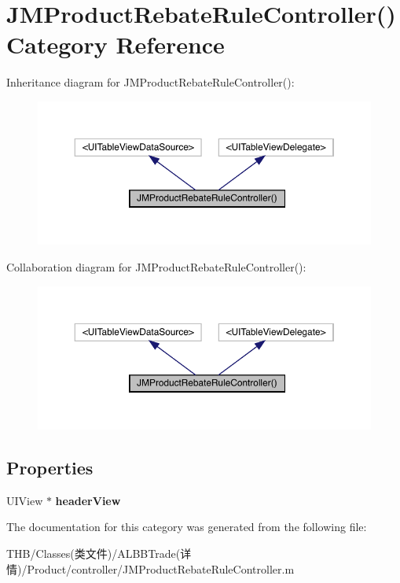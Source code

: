 \hypertarget{category_j_m_product_rebate_rule_controller_07_08}{}\section{J\+M\+Product\+Rebate\+Rule\+Controller() Category Reference}
\label{category_j_m_product_rebate_rule_controller_07_08}


Inheritance diagram for J\+M\+Product\+Rebate\+Rule\+Controller()\+:\nopagebreak
\begin{figure}[H]
\begin{center}
\leavevmode
\includegraphics[width=350pt]{category_j_m_product_rebate_rule_controller_07_08__inherit__graph}
\end{center}
\end{figure}


Collaboration diagram for J\+M\+Product\+Rebate\+Rule\+Controller()\+:\nopagebreak
\begin{figure}[H]
\begin{center}
\leavevmode
\includegraphics[width=350pt]{category_j_m_product_rebate_rule_controller_07_08__coll__graph}
\end{center}
\end{figure}
\subsection*{Properties}
\begin{DoxyCompactItemize}
\item 
\mbox{\label{category_j_m_product_rebate_rule_controller_07_08_a1aa98f116cb6dcdeea87d0aed0e443e9}} 
U\+I\+View $\ast$ {\bfseries header\+View}
\end{DoxyCompactItemize}


The documentation for this category was generated from the following file\+:\begin{DoxyCompactItemize}
\item 
T\+H\+B/\+Classes(类文件)/\+A\+L\+B\+B\+Trade(详情)/\+Product/controller/J\+M\+Product\+Rebate\+Rule\+Controller.\+m\end{DoxyCompactItemize}
